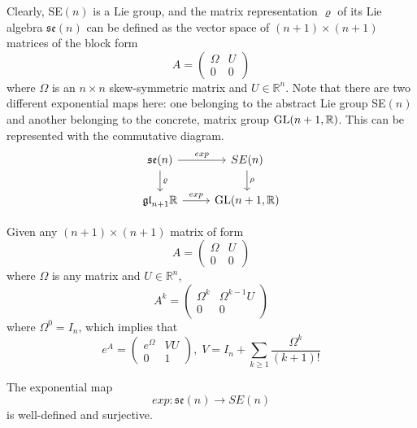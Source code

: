     Clearly, SE$(n)$ is a Lie group, and the matrix representation $\varrho$ of its Lie algebra $\mathfrak{se}(n)$ can be defined as the vector space of $(n+1) \times (n+1)$ matrices of the block form 
    \begin{equation}
      A = \begin{pmatrix}
      \Omega & U \\0 & 0
      \end{pmatrix}
    \end{equation}
    where $\Omega$ is an $n \times n$ skew-symmetric matrix and $U \in \mathbb{R}^n$. Note that there are two different exponential maps here: one belonging to the abstract Lie group SE$(n)$ and another belonging to the concrete, matrix group $\operatorname{GL}(n+1, \mathbb{R})$. This can be represented with the commutative diagram. 
    \[\begin{tikzcd}
    \mathfrak{se}(n) \arrow{r}{exp} \arrow{d}{\varrho} & SE(n) \arrow{d} {\rho}\\
    \mathfrak{gl}_{n+1} \mathbb{R} \arrow{r}{exp} & \GL(n+1, \mathbb{R})
    \end{tikzcd}\]

    \begin{lemma}
      Given any $(n+1) \times (n+1)$ matrix of form 
      \begin{equation}
        A = \begin{pmatrix}
         \Omega & U \\0&0
        \end{pmatrix}
      \end{equation}
      where $\Omega$ is any matrix and $U \in \mathbb{R}^n$, 
      \begin{equation}
        A^k = \begin{pmatrix}
        \Omega^k & \Omega^{k-1} U \\0&0
        \end{pmatrix}
      \end{equation}
      where $\Omega^0 = I_n$, which implies that
      \begin{equation}
        e^A = \begin{pmatrix}
        e^\Omega & V U \\ 0 & 1
        \end{pmatrix}, \; V = I_n + \sum_{k \geq 1} \frac{\Omega^k}{(k+1)!}
      \end{equation}
    \end{lemma}

    \begin{theorem}
      The exponential map
      \begin{equation}
        exp: \mathfrak{se}(n) \longrightarrow SE(n)
      \end{equation}
      is well-defined and surjective. 
    \end{theorem}

